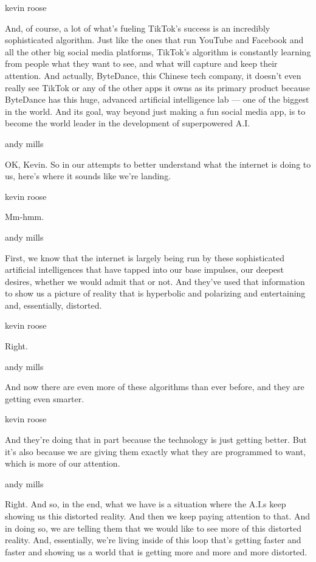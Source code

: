 kevin roose

And, of course, a lot of what's fueling TikTok's success is an
incredibly sophisticated algorithm. Just like the ones that run YouTube
and Facebook and all the other big social media platforms, TikTok's
algorithm is constantly learning from people what they want to see, and
what will capture and keep their attention. And actually, ByteDance,
this Chinese tech company, it doesn't even really see TikTok or any of
the other apps it owns as its primary product because ByteDance has this
huge, advanced artificial intelligence lab --- one of the biggest in the
world. And its goal, way beyond just making a fun social media app, is
to become the world leader in the development of superpowered A.I.

andy mills

OK, Kevin. So in our attempts to better understand what the internet is
doing to us, here's where it sounds like we're landing.

kevin roose

Mm-hmm.

andy mills

First, we know that the internet is largely being run by these
sophisticated artificial intelligences that have tapped into our base
impulses, our deepest desires, whether we would admit that or not. And
they've used that information to show us a picture of reality that is
hyperbolic and polarizing and entertaining and, essentially, distorted.

kevin roose

Right.

andy mills

And now there are even more of these algorithms than ever before, and
they are getting even smarter.

kevin roose

And they're doing that in part because the technology is just getting
better. But it's also because we are giving them exactly what they are
programmed to want, which is more of our attention.

andy mills

Right. And so, in the end, what we have is a situation where the A.I.s
keep showing us this distorted reality. And then we keep paying
attention to that. And in doing so, we are telling them that we would
like to see more of this distorted reality. And, essentially, we're
living inside of this loop that's getting faster and faster and showing
us a world that is getting more and more and more distorted.

